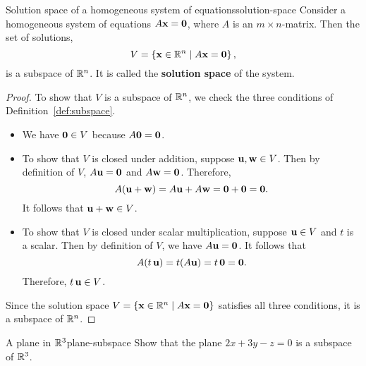 \begin{proposition}{Solution space of a homogeneous system of equations}{solution-space}
  Consider a homogeneous system of equations $A\mbox{\bf x} = \mbox{\bf 0}$,
  where $A$ is an $m\times n$-matrix. Then the set of solutions,
  \begin{equation*}
    V=\left\{\mbox{\bf x}\in\mathbb{R}^n \mid A\mbox{\bf x} = \mbox{\bf 0}\right\},
  \end{equation*}
  is a subspace of $\mathbb{R}^n$. It is called the \textbf{solution space} of
  the system.%
\end{proposition}

\begin{proof}
  To show that $V$ is a subspace of $\mathbb{R}^{n}$, we check the three
  conditions of Definition~\ref{def:subspace}.
  \begin{itemize}
  \item We have $\mbox{\bf 0}\in V$ because $A\mbox{\bf 0}=\mbox{\bf 0}$.
  \item To show that $V$ is closed under addition, suppose
    $\mbox{\bf u},\mbox{\bf w}\in V$.  Then by definition of $V$,
    $A\mbox{\bf u}=\mbox{\bf 0}$ and $A\mbox{\bf w}=\mbox{\bf 0}$.  Therefore,
    \begin{equation*}
      A(\mbox{\bf u}+\mbox{\bf w}) = A\mbox{\bf u} + A\mbox{\bf w} = \mbox{\bf 0}+\mbox{\bf 0}
      = \mbox{\bf 0}.
    \end{equation*}
    It follows that $\mbox{\bf u}+\mbox{\bf w}\in V$.
  \item To show that $V$ is closed under scalar multiplication,
    suppose $\mbox{\bf u}\in V$ and $t$ is a scalar. Then by definition of
    $V$, we have $A\mbox{\bf u}=\mbox{\bf 0}$. It follows that 
    \begin{equation*}
      A(t\,\mbox{\bf u}) = t(A\mbox{\bf u}) = t\,\mbox{\bf 0} = \mbox{\bf 0}.
    \end{equation*}
    Therefore, $t\,\mbox{\bf u}\in V$.
  \end{itemize}
  Since the solution space
  $V=\left\{\mbox{\bf x}\in\mathbb{R}^n \mid A\mbox{\bf x} = \mbox{\bf 0}\right\}$ satisfies all
  three conditions, it is a subspace of $\mathbb{R}^n$.
\end{proof}

\begin{example}{A plane in $\mathbb{R}^3$}{plane-subspace}
  Show that the plane $2x+3y-z=0$ is a subspace of $\mathbb{R}^3$.
\end{example}

